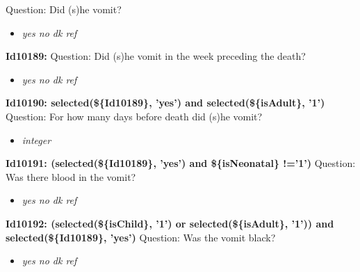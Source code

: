 \documentclass{article}%
\begin{document}
Question: Did (s)he vomit?\newline%
%
\begin{itemize}%
\item%
\textit{yes\newline%
 no\newline%
 dk\newline%
 ref\newline%
}%
\end{itemize}%
\textbf{Id10189: \newline%
}%
Question: Did (s)he vomit in the week preceding the death?\newline%
%
\begin{itemize}%
\item%
\textit{yes\newline%
 no\newline%
 dk\newline%
 ref\newline%
}%
\end{itemize}%
\textbf{Id10190: selected(\$\{Id10189\}, 'yes') and selected(\$\{isAdult\}, '1')\newline%
}%
Question: For how many days before death did (s)he vomit?\newline%
%
\begin{itemize}%
\item%
\textit{integer\newline%
}%
\end{itemize}%
\textbf{Id10191: (selected(\$\{Id10189\}, 'yes') and \$\{isNeonatal\} !='1')\newline%
}%
Question: Was there blood in the vomit?\newline%
%
\begin{itemize}%
\item%
\textit{yes\newline%
 no\newline%
 dk\newline%
 ref\newline%
}%
\end{itemize}%
\textbf{Id10192: (selected(\$\{isChild\}, '1') or selected(\$\{isAdult\}, '1')) and selected(\$\{Id10189\}, 'yes')\newline%
}%
Question: Was the vomit black?\newline%
%
\begin{itemize}%
\item%
\textit{yes\newline%
 no\newline%
 dk\newline%
 ref\newline%
}%
\end{itemize}%
\end{document}
